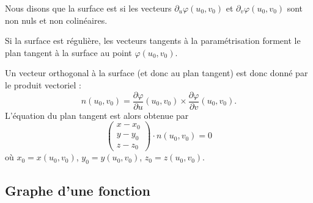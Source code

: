 \begin{definition}      \label{DefSurfReguliere}
    Nous disons que la surface est  si les vecteurs $\partial_u\varphi(u_0,v_0)$ et $\partial_v\varphi(u_0,v_0)$ sont non nuls et non colinéaires.
\end{definition}
Si la surface est régulière, les vecteurs tangents à la paramétrisation forment le plan tangent à la surface au point $\varphi(u_0,v_0)$.

Un vecteur orthogonal à la surface (et donc au plan tangent) est donc donné par le produit vectoriel :
\begin{equation}
    n(u_0,v_0)=\frac{ \partial \varphi }{ \partial u }(u_0,v_0)  \times \frac{ \partial \varphi }{ \partial v }(u_0,v_0).
\end{equation}
L'équation du plan tangent est alors obtenue par
\begin{equation}        \label{EqPlanTgSurfaceParm}
    \begin{pmatrix}
        x-x_0    \\
        y-y_0    \\
        z-z_0
    \end{pmatrix}\cdot n(u_0,v_0)=0
\end{equation}
où $x_0=x(u_0,v_0)$, $y_0=y(u_0,v_0)$, $z_0=z(u_0,v_0)$.

\subsection{Graphe d'une fonction}


